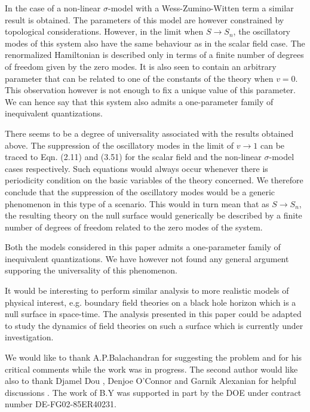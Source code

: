 \documentclass[a4paper,12pt]{article}
\begin{document}
In the case of a non-linear $\sigma$-model with a Wess-Zumino-Witten term a
similar result is obtained. The parameters of this model are however
constrained by topological considerations. However, in the limit when 
$S \rightarrow S_n$, the oscillatory modes of this system also have the same
behaviour as in the scalar field case. The renormalized Hamiltonian is
described only in terms of a finite number of degrees of freedom given by
the zero modes. It is also seen to contain an arbitrary parameter that 
can be related to one of the constants of the theory  when $v = 0$.
This observation however is not enough to fix a unique
 value of this parameter. We can hence say that this
system also admits a one-parameter family of inequivalent quantizations.

There seems to be a degree of universality associated with the results
obtained above. The suppression of the oscillatory modes in the limit of 
$v \rightarrow 1$ can be traced to Eqn. (2.11) and (3.51) for the scalar
field and the non-linear $\sigma$-model cases respectively. Such equations
would always occur whenever there is periodicity condition on the basic
variables of the theory concerned. We therefore conclude that the
suppression of the oscillatory modes would be a generic phenomenon in this
type of a scenario. This would in turn mean that as $S \rightarrow S_n$,
the resulting theory on the null surface would generically be described by a
finite number of degrees of freedom related to the zero modes of the system.


Both the models considered in this paper admits a one-parameter family of
inequivalent quantizations. We have however not found any general argument
supporing the universality of this phenomenon.  



It would be interesting to perform similar analysis to more realistic models
of physical interest, e.g. boundary field theories on a black hole horizon
which is a null surface in space-time.
The analysis presented in this paper could be adapted to study the dynamics
of field theories on such a surface which is currently under investigation.

\newpage
\vskip 5mm
\noindent
We would like to thank A.P.Balachandran for suggesting the problem and
for his critical comments while the work was in progress.  
The second author would like also to thank 
Djamel Dou , Denjoe O'Connor and Garnik
 Alexanian for helpful discussions . The work of
B.Y was supported in part by the DOE under contract number
DE-FG02-85ER40231.
\end{document}
